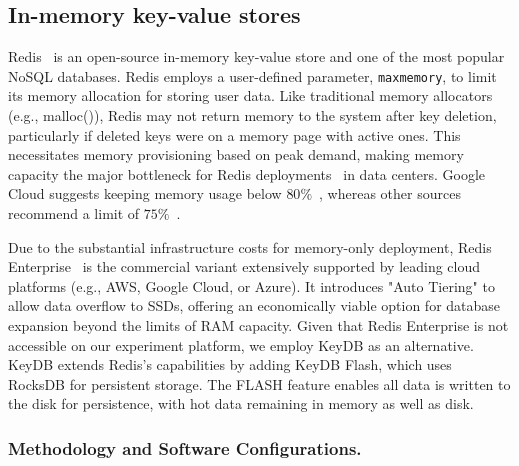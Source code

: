 \subsection{In-memory key-value stores}
\label{ssec:keydb}
Redis~\cite{redis} is an open-source in-memory key-value store and one of the most popular NoSQL databases. Redis employs a user-defined parameter, \texttt{maxmemory}, to limit its memory allocation for storing user data. Like traditional memory allocators (e.g., malloc()), Redis may not return memory to the system after key deletion, particularly if deleted keys were on a memory page with active ones. This necessitates memory provisioning based on peak demand, making memory capacity the major bottleneck for Redis deployments~\cite{manageredis} in data centers. Google Cloud suggests keeping memory usage below $80\%$~\cite{googlecloud}, whereas other sources recommend a limit of $75\%$~\cite{manageredis}. 

Due to the substantial infrastructure costs for memory-only deployment, Redis Enterprise~\cite{redisenterprise} is the commercial variant extensively supported by leading cloud platforms (e.g., AWS, Google Cloud, or Azure). It introduces "Auto Tiering"\cite{redisautotiering} to allow data overflow to SSDs, offering an economically viable option for database expansion beyond the limits of RAM capacity. Given that Redis Enterprise is not accessible on our experiment platform, we employ KeyDB as an alternative. KeyDB extends Redis's capabilities by adding KeyDB Flash, which uses RocksDB for persistent storage. The FLASH feature enables all data is written to the disk for persistence, with hot data remaining in memory as well as disk.

\subsubsection{Methodology and Software Configurations.}


